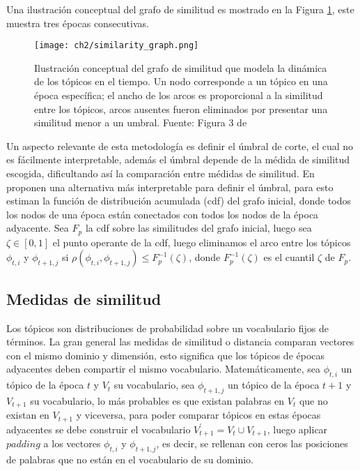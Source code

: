 \documentclass[letterpaper,12pt,oneside]{book} %
\begin{document}
Una ilustración conceptual del grafo de similitud es mostrado en la Figura \ref{img:graph}, este muestra tres épocas consecutivas.

\begin{figure}
    \centering
    \texttt{[image: ch2/similarity\_graph.png]}
    \caption{Ilustración conceptual del grafo de similitud que modela la dinámica de los tópicos en el tiempo. Un nodo corresponde a un tópico en una época específica; el ancho de los arcos es proporcional a la similitud entre los tópicos, arcos ausentes fueron eliminados por presentar una similitud menor a un umbral. Fuente:  Figura 3 de \citep{beykikhoshk2018discovering}}
    \label{img:graph}
\end{figure}

Un aspecto relevante de esta metodología es definir el úmbral de corte, el cual no es fácilmente interpretable, además el úmbral depende de la médida de similitud escogida, dificultando así la comparación entre médidas de similitud. En \citep{beykikhoshk2018discovering} proponen una alternativa más interpretable para definir el úmbral, para esto estiman la función de distribución acumulada (cdf) del grafo inicial, donde todos los nodos de una época están conectados con todos los nodos de la época adyacente. Sea $F_{p}$ la cdf sobre las similitudes del grafo inicial, luego sea $\zeta \in [0,1]$ el punto operante de la cdf, luego eliminamos el arco entre los tópicos $\phi_{t,i}$ y $\phi_{t+1,j}$ si $\rho(\phi_{t,i}, \phi_{t+1,j})\leq F_{p}^{-1}(\zeta)$, donde  $F_{p}^{-1}(\zeta)$ es el cuantil $\zeta$ de $F_{p}$.


\subsection{Medidas de similitud}

Los tópicos son distribuciones de probabilidad sobre un vocabulario fijos de términos. La gran general las medidas de similitud o distancia comparan vectores con el mismo dominio y dimensión, esto significa que los tópicos de épocas adyacentes deben compartir el mismo vocabulario. Matemáticamente, sea $\phi_{t, i}$ un tópico de la época $t$ y $V_{t}$ su vocabulario, sea  $\phi_{t+1, j}$ un tópico de la época $t+1$ y $V_{t+1}$ su vocabulario, lo más probables es que existan palabras en $V_{t}$ que no existan en $V_{t+1}$ y viceversa, para poder comparar tópicos en estas épocas adyacentes se debe construir el vocabulario $V_{t+1}^{'}=V_{t}\cup V_{t+1}$, luego aplicar $padding$ a los vectores $\phi_{t, i}$ y $\phi_{t+1, j}$, es decir, se rellenan con ceros las posiciones de palabras que no están en el vocabulario de su dominio.\\
\end{document}
